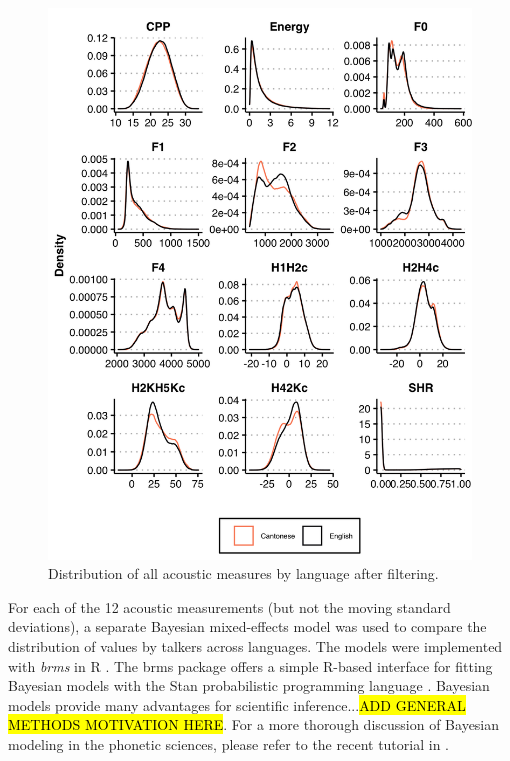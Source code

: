 \begin{figure}[htbp]
    \begin{center}
    \includegraphics[width=\linewidth]{figures/ch3_allmeasuresdensity_5in.png} 
    \caption{Distribution of all acoustic measures by language after filtering.}
    \label{ch3:fig:allmeasures}
    \end{center}
\end{figure}

For each of the 12 acoustic measurements (but not the moving standard deviations), a separate Bayesian mixed-effects model was used to compare the distribution of values by talkers across languages. The models were implemented with \textit{brms} \citep[version 2.15.0;][]{burkner_2017_brms} in R \citep[version 4.0.5;][]{r_2021}. The brms package offers a simple R-based interface for fitting Bayesian models with the Stan probabilistic programming language \citep{stan_2021}. Bayesian models provide many advantages for scientific inference...\hl{ADD GENERAL METHODS MOTIVATION HERE}. For a more thorough discussion of Bayesian modeling in the phonetic sciences, please refer to the recent tutorial in \citet{vasishth_2018_bayesian}. 

